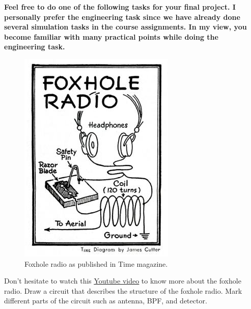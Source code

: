 \documentclass[11pt]{article}
\begin{document}
\textbf{Feel free to do one of the following tasks for your final project. I personally prefer the engineering task since we have already done several simulation tasks in the course assignments. In my view, you become familiar with many practical points while doing the engineering task.}



\begin{question}

\begin{figure}[h]
\centering
\includegraphics[scale=2.5]{Fig/foxhole.jpg}
\caption{Foxhole radio as published in Time magazine.}\label{fig:foxhole}
\end{figure}

\begin{subquestion}{Don't hesitate to watch this \underline{{\color{blue}\href{https://www.youtube.com/watch?v=_AI2Jixj5Bs&t=18s}{Youtube video}}} to know more about the foxhole radio. Draw a circuit that describes the structure of the foxhole radio. Mark different parts of the circuit such as antenna, BPF, and detector.
} 
\end{subquestion}


\end{question}
\end{document}
